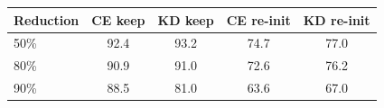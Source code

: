 \begin{tabular}{lcccc}\toprule
Reduction & CE keep & KD keep & CE re-init & KD re-init\\\midrule
50\% & 92.4 & 93.2 & 74.7 & 77.0\\
80\% & 90.9 & 91.0 & 72.6 & 76.2\\
90\% & 88.5 & 81.0 & 63.6 & 67.0\\
\bottomrule\end{tabular}